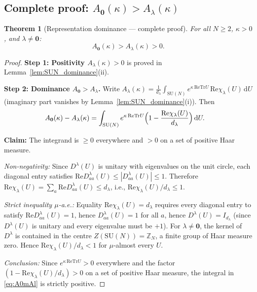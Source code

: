 \documentclass[11pt,a4paper]{amsart}
\newtheorem{theorem}{Theorem}[section]
\theoremstyle{definition}
\newcommand{\SU}{\mathrm{SU}}
\newcommand{\Z}{\mathbb{Z}}
\newcommand{\re}{\mathrm{Re}}
\newcommand{\Tr}{\mathrm{Tr}}
\begin{document}
\subsection{Complete proof: $A_\mathbf{0}(\kappa) > A_\lambda(\kappa)$}
\label{sec:dominance_proof}

\begin{theorem}[Representation dominance — complete proof]
\label{thm:rep_dom_full}
For all $N \ge 2$, $\kappa > 0$, and $\lambda \ne \mathbf{0}$:
\begin{equation}
\label{eq:dominance_full}
  A_\mathbf{0}(\kappa) > A_\lambda(\kappa) > 0.
\end{equation}
\end{theorem}
\begin{proof}
\textbf{Step 1: Positivity $A_\lambda(\kappa)>0$} is proved in
Lemma~\ref{lem:SUN_dominance}(ii).

\textbf{Step 2: Dominance $A_\mathbf{0} > A_\lambda$.}
Write $A_\lambda(\kappa) = \frac{1}{d_\lambda}\int_{\SU(N)}
e^{\kappa\,\re\Tr U}\,\re\chi_\lambda(U)\,\mathrm{d}U$
(imaginary part vanishes by Lemma~\ref{lem:SUN_dominance}(i)).
Then
\begin{align}
  A_\mathbf{0}(\kappa) - A_\lambda(\kappa)
  &= \int_{\SU(N)} e^{\kappa\,\re\Tr U}
     \Bigl(1 - \frac{\re\chi_\lambda(U)}{d_\lambda}\Bigr)\,\mathrm{d}U.
  \label{eq:A0mAl}
\end{align}

\textbf{Claim:} The integrand is $\ge 0$ everywhere and $> 0$ on a set of
positive Haar measure.

\emph{Non-negativity:}
Since $D^\lambda(U)$ is unitary with eigenvalues on the unit circle,
each diagonal entry satisfies $\re D^\lambda_{aa}(U) \le |D^\lambda_{aa}(U)| \le 1$.
Therefore $\re\chi_\lambda(U) = \sum_a \re D^\lambda_{aa}(U) \le d_\lambda$,
i.e., $\re\chi_\lambda(U)/d_\lambda \le 1$.

\emph{Strict inequality $\mu$-a.e.:}
Equality $\re\chi_\lambda(U) = d_\lambda$ requires every diagonal entry to
satisfy $\re D^\lambda_{aa}(U) = 1$, hence $D^\lambda_{aa}(U)=1$ for all $a$,
hence $D^\lambda(U) = I_{d_\lambda}$
(since $D^\lambda(U)$ is unitary and every eigenvalue must be $+1$).
For $\lambda \ne \mathbf{0}$, the kernel of $D^\lambda$ is contained in the
centre $Z(\SU(N)) = \Z_N$, a finite group of Haar measure zero.
Hence $\re\chi_\lambda(U)/d_\lambda < 1$ for $\mu$-almost every $U$.

\emph{Conclusion:}
Since $e^{\kappa\,\re\Tr U} > 0$ everywhere and the factor
$(1 - \re\chi_\lambda(U)/d_\lambda) > 0$ on a set of positive Haar measure,
the integral in \eqref{eq:A0mAl} is strictly positive.
\end{proof}
\end{document}
